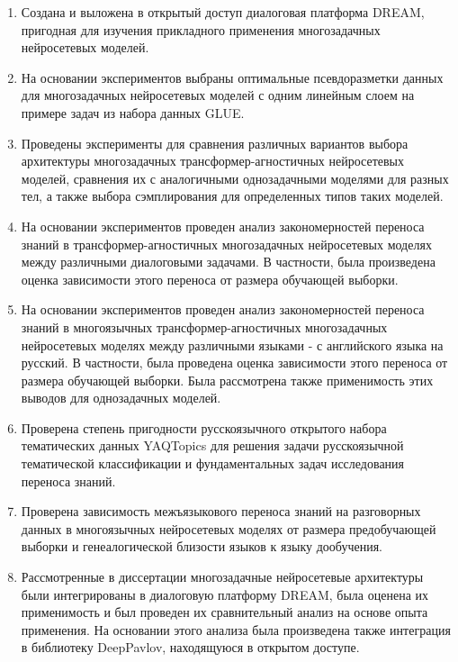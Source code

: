 {\novelty}
\begin{enumerate}
  \item {Создана и выложена в открытый доступ диалоговая платформа DREAM, пригодная для изучения прикладного применения многозадачных нейросетевых моделей.}
  \item {На основании экспериментов выбраны оптимальные псевдоразметки данных для многозадачных нейросетевых моделей с одним линейным слоем на примере задач из набора данных GLUE.}
  \item {Проведены эксперименты для сравнения различных вариантов выбора архитектуры многозадачных трансформер-агностичных нейросетевых моделей, сравнения их с аналогичными однозадачными моделями для разных тел, а также выбора сэмплирования для определенных типов таких моделей.}
  \item {На основании экспериментов проведен анализ закономерностей переноса знаний в трансформер-агностичных многозадачных нейросетевых моделях между различными диалоговыми задачами. В частности, была произведена оценка зависимости этого переноса от размера обучающей выборки.}
  \item {На основании экспериментов проведен анализ закономерностей переноса знаний в многоязычных трансформер-агностичных многозадачных нейросетевых моделях между различными языками - с английского языка на русский. В частности, была проведена оценка зависимости этого переноса от размера обучающей выборки. Была рассмотрена также применимость этих выводов для однозадачных моделей.}
  \item {Проверена степень пригодности русскоязычного открытого набора тематических данных {YAQTopics} для решения задачи русскоязычной тематической классификации и фундаментальных задач исследования переноса знаний.}
  \item {Проверена зависимость межъязыкового переноса знаний на разговорных данных в многоязычных нейросетевых моделях от размера предобучающей выборки и генеалогической близости языков к языку дообучения.}
  \item {Рассмотренные в диссертации многозадачные нейросетевые архитектуры были интегрированы в диалоговую платформу DREAM, была оценена их применимость и был проведен их сравнительный анализ на основе опыта применения. На основании этого анализа была произведена также интеграция в библиотеку DeepPavlov, находящуюся в открытом доступе.} 
\end{enumerate}

